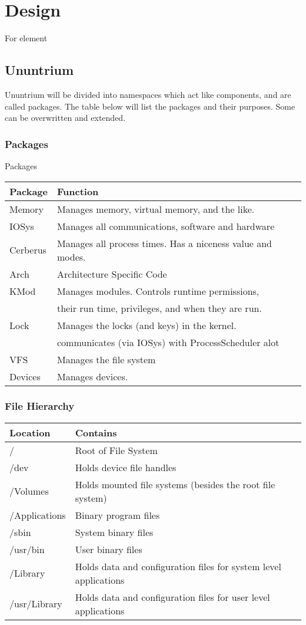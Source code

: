 \documentclass[12pt]{article}
\begin{document}
\section{Design}
For element
\subsection{Ununtrium}
Ununtrium will be divided into namespaces which act like components, and are called packages. The table below will list the packages and their purposes. Some can be overwritten and extended.
\subsubsection{Packages}
Packages


\noindent\begin{tabular}{|l|l|}
\hline
    Package & Function\\
  \hline
    Memory & Manages memory, virtual memory, and the like.\\
  IOSys & Manages all communications, software and hardware\\
	Cerberus & Manages all process times. Has a niceness value and modes.\\
	Arch & Architecture Specific Code\\
	KMod & Manages modules. Controls runtime permissions, \\&their run time, privileges, and when they are run.\\
	Lock & Manages the locks (and keys) in the kernel. \\& communicates (via IOSys) with ProcessScheduler alot\\
	VFS & Manages the file system\\
	Devices & Manages devices.\\
	\hline
\end{tabular}
\subsubsection{File Hierarchy}

\begin{tabular}{|l|l|}
\hline
Location & Contains \\
\hline
/ & Root of File System \\
/dev & Holds device file handles\\
/Volumes & Holds mounted file systems (besides the root file system)\\
/Applications & Binary program files\\
/sbin & System binary files\\
/usr/bin & User binary files\\
/Library & Holds data and configuration files for system level applications\\
/usr/Library & Holds data and configuration files for user level applications\\
\hline
\end{tabular}
\end{document}
